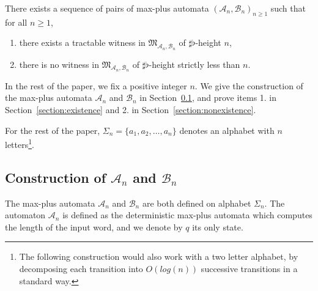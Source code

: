 \documentclass{lmcs}
\theoremstyle{remark}
\newcommand{\ideal}{\mathfrak{M}}
\newcommand{\autA}{\mathcal{A}}
\newcommand{\autB}{\mathcal{B}}
\theoremstyle{remark}
\begin{document}
\begin{thm}
There exists a sequence of pairs of max-plus automata $(\autA_n, \autB_n)_{n \geq 1}$ such that for all $n \geq 1$,
\begin{enumerate}
\item there exists a tractable witness in $\ideal_{\autA_n,\autB_n}$ of $\sharp\flat$-height $n$,
\item there is no witness in $\ideal_{\autA_n,\autB_n}$ of $\sharp\flat$-height strictly less than $n$.
\end{enumerate}
\end{thm}

In the rest of the paper, we fix a positive integer $n$. We give the construction of the max-plus automata $\autA_n$ and $\autB_n$ in Section~\ref{section:constructionAB}, and prove items 1. in Section~\ref{section:existence} and 2. in Section~\ref{section:nonexistence}.

For the rest of the paper, $\Sigma_n = \{a_1, a_2, \ldots, a_n\}$ denotes an alphabet with $n$ letters\footnote{The following construction would also work with a two letter alphabet, by decomposing each transition into $O(log(n))$ successive transitions in a standard way.}. 

\subsection{Construction of \texorpdfstring{$\autA_n$}{A\_n} and \texorpdfstring{$\autB_n$}{B\_n}}
\label{section:constructionAB}

The max-plus automata $\autA_n$ and $\autB_n$ are both defined on alphabet $\Sigma_n$.
The automaton $\autA_n$ is defined as the deterministic max-plus automata which computes the length of the input word, and we denote by $q$ its only state. 

\begin{center}
\end{center}
\end{document}
